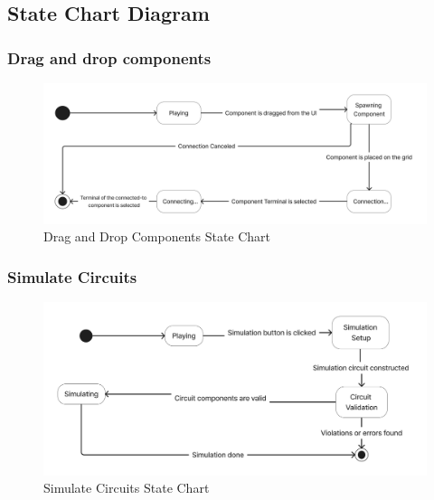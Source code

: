\documentclass[../main.tex]{subfiles}
\begin{document}
\newpage
\subsection{State Chart Diagram}
\subsubsection{Drag and drop components}

\begin{figure}[h!]
\centering
\includegraphics[scale=0.1]{images/chapter3/stateChart1.png}
\caption{Drag and Drop Components State Chart}
\label{Drag And Drop Components State Chart}
\end{figure}
\subsubsection{Simulate Circuits}
\begin{figure}[h!]
\centering
\includegraphics[scale=0.1]{images/chapter3/StateChart2.png}
\caption{Simulate Circuits State Chart}
\label{Simulate Circuits State Chart}
\end{figure}
\newpage
\end{document}
